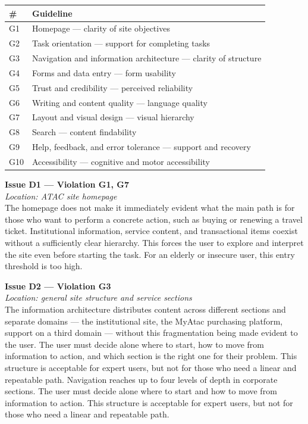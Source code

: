 ﻿\documentclass[11pt,a4paper]{article}
\begin{document}
\begin{tabular}{ll}
\toprule
\textbf{\#} & \textbf{Guideline} \\
\midrule
G1 & Homepage --- clarity of site objectives \\
G2 & Task orientation --- support for completing tasks \\
G3 & Navigation and information architecture --- clarity of structure \\
G4 & Forms and data entry --- form usability \\
G5 & Trust and credibility --- perceived reliability \\
G6 & Writing and content quality --- language quality \\
G7 & Layout and visual design --- visual hierarchy \\
G8 & Search --- content findability \\
G9 & Help, feedback, and error tolerance --- support and recovery \\
G10 & Accessibility --- cognitive and motor accessibility \\
\bottomrule
\end{tabular}

\bigskip

\noindent\textbf{Issue D1 --- Violation G1, G7}\label{atac:D1}\\
\textit{Location: ATAC site homepage}\\

\noindent The homepage does not make it immediately evident what the main path is for those who want to perform a concrete action, such as buying or renewing a travel ticket. Institutional information, service content, and transactional items coexist without a sufficiently clear hierarchy. This forces the user to explore and interpret the site even before starting the task. For an elderly or insecure user, this entry threshold is too high.

\bigskip

\noindent\textbf{Issue D2 --- Violation G3}\label{atac:D2}\\
\textit{Location: general site structure and service sections}\\

\noindent The information architecture distributes content across different sections and separate domains --- the institutional site, the MyAtac purchasing platform, support on a third domain --- without this fragmentation being made evident to the user. The user must decide alone where to start, how to move from information to action, and which section is the right one for their problem. This structure is acceptable for expert users, but not for those who need a linear and repeatable path. Navigation reaches up to four levels of depth in corporate sections. The user must decide alone where to start and how to move from information to action. This structure is acceptable for expert users, but not for those who need a linear and repeatable path.
\end{document}

